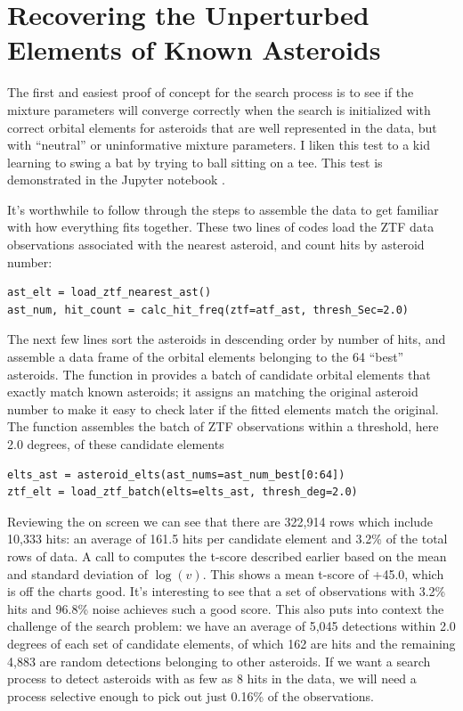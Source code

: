 \section{Recovering the Unperturbed Elements of Known Asteroids}
\label{section_results_known_ast_unperturbed}

The first and easiest proof of concept for the search process is to see if the mixture parameters will converge correctly
when the search is initialized with correct orbital elements for asteroids that are well represented in the data,
but with ``neutral'' or uninformative mixture parameters.
I liken this test to a kid learning to swing a bat by trying to ball sitting on a tee.
This test is demonstrated in the Jupyter notebook .

It's worthwhile to follow through the steps to assemble the data to get familiar with how everything fits together.
These two lines of codes load the ZTF data observations associated with the nearest asteroid, and count hits by asteroid number:
\begin{lstlisting}[style=CodeSnippet]
ast_elt = load_ztf_nearest_ast()
ast_num, hit_count = calc_hit_freq(ztf=atf_ast, thresh_Sec=2.0)
\end{lstlisting}
The next few lines sort the asteroids in descending order by number of hits, 
and assemble a data frame of the orbital elements belonging to the 64 ``best'' asteroids.
The function  in  provides a batch of candidate orbital elements
that exactly match known asteroids; it assigns an  matching the original asteroid number to make it easy
to check later if the fitted elements match the original.
The function  assembles the batch of ZTF observations within a threshold, 
here 2.0 degrees, of these candidate elements
\begin{lstlisting}[style=CodeSnippet]
elts_ast = asteroid_elts(ast_nums=ast_num_best[0:64])
ztf_elt = load_ztf_batch(elts=elts_ast, thresh_deg=2.0)
\end{lstlisting}

Reviewing the  on screen we can see that there are 322,914 rows which include 10,333 hits:
an average of 161.5 hits per candidate element and 3.2\% of the total rows of data.
A call to  computes the t-score described earlier based on the mean and standard deviation of $\log(v)$.
This shows a mean t-score of +45.0, which is off the charts good.
It's interesting to see that a set of observations with 3.2\% hits and 96.8\% noise achieves such a good score.
This also puts into context the challenge of the search problem: 
we have an average of 5,045 detections within 2.0 degrees of each set of candidate elements,
of which 162 are hits and the remaining 4,883 are random detections belonging to other asteroids.
If we want a search process to detect asteroids with as few as 8 hits in the data, 
we will need a process selective enough to pick out just 0.16\% of the observations.


